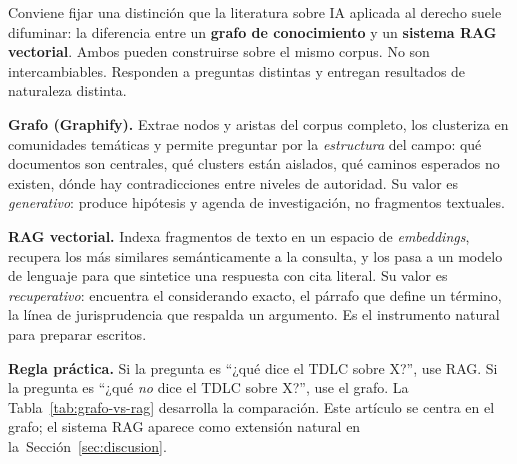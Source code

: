\documentclass[12pt,a4paper]{article}
\begin{document}
Conviene fijar una distinción que la literatura sobre IA aplicada al derecho
suele difuminar: la diferencia entre un \textbf{grafo de conocimiento} y un
\textbf{sistema RAG vectorial}. Ambos pueden construirse sobre el mismo corpus.
No son intercambiables. Responden a preguntas distintas y entregan resultados de
naturaleza distinta.

\begin{keybox}
\textbf{Grafo (Graphify).} Extrae nodos y aristas del corpus completo, los
clusteriza en comunidades temáticas y permite preguntar por la \emph{estructura}
del campo: qué documentos son centrales, qué clusters están aislados, qué
caminos esperados no existen, dónde hay contradicciones entre niveles de
autoridad. Su valor es \emph{generativo}: produce hipótesis y agenda de
investigación, no fragmentos textuales.

\medskip
\textbf{RAG vectorial.} Indexa fragmentos de texto en un espacio de \emph{embeddings},
recupera los más similares semánticamente a la consulta, y los pasa a un modelo
de lenguaje para que sintetice una respuesta con cita literal. Su valor es
\emph{recuperativo}: encuentra el considerando exacto, el párrafo que define un
término, la línea de jurisprudencia que respalda un argumento. Es el instrumento
natural para preparar escritos.

\medskip
\textbf{Regla práctica.} Si la pregunta es ``¿qué dice el TDLC sobre X?'', use
RAG. Si la pregunta es ``¿qué \emph{no} dice el TDLC sobre X?'', use el grafo.
La Tabla~\ref{tab:grafo-vs-rag} desarrolla la comparación. Este artículo se
centra en el grafo; el sistema RAG aparece como extensión natural en
la~Sección~\ref{sec:discusion}.
\end{keybox}
\end{document}
